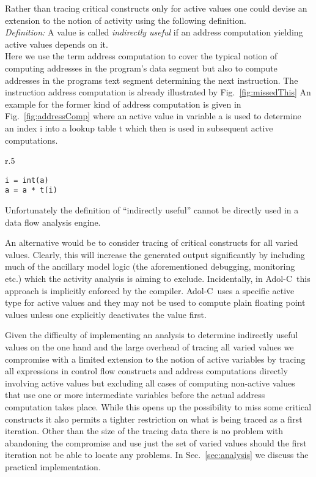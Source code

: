 \documentclass{article}
\newcommand{\adolc}{Adol-C}
\newcommand{\refsec}[1]{{Sec.~\ref{#1}}}
\newcommand{\reffig}[1]{{Fig.~\ref{#1}}}
\begin{document}
Rather than tracing critical constructs only for  active values 
one could devise an extension to the notion of activity using the following 
definition.\\
{\em Definition: } A value is called {\em indirectly useful} 
if an address computation yielding active values depends on it.\\
Here we use the term  address computation to cover the typical notion of 
computing addresses in the program's data segment but also to compute 
addresses in the programs text segment determining the next instruction. 
The instruction address computation is already illustrated by \reffig{fig:missedThis}
An example for the former kind of address computation is given in 
\reffig{fig:addressComp} where an active value in variable a is used to 
determine an index i into a lookup table t which then is used in 
subsequent active computations.
\begin{wrapfigure}{r}{.5\textwidth}
\begin{minipage}{.95\linewidth}
\begin{lstlisting}[frame=single]
i = int(a) 
a = a * t(i)
\end{lstlisting}
\end{minipage}
\caption{An address computation into a lookup table impacting the subsequent computation}\label{fig:addressComp} 
\end{wrapfigure}
Unfortunately the definition of ``indirectly useful'' cannot be directly used in a 
data flow analysis engine. 

An alternative would be to consider tracing of critical constructs for all varied values. 
Clearly, this will increase the generated output significantly by including much 
of the ancillary model logic (the aforementioned debugging, monitoring etc.) which 
the activity analysis is aiming to exclude. 
Incidentally, in \adolc\ this approach is implicitly enforced by the compiler. 
\adolc\ uses a specific  
active type for active values and they may not be used to 
compute plain floating point values unless one 
explicitly deactivates the value first. 

Given the difficulty of implementing an analysis to determine indirectly useful values 
on the one hand and the large overhead of tracing all varied values we 
compromise with a limited extension to the notion of active variables by tracing  
all expressions in control flow constructs and address computations directly involving active values
but excluding all cases of computing non-active values that use one or more intermediate 
variables before the actual address computation takes place. 
While this opens up the possibility to miss some critical constructs 
it also permits a tighter restriction on what is being traced as a first iteration. 
Other than the size of the tracing data  there is no problem with abandoning the compromise
and use just the set of varied values should the first iteration not be able to 
locate any problems.    
In \refsec{sec:analysis} we discuss the practical implementation.
\end{document}
